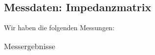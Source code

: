 \subsection{Messdaten: Impedanzmatrix}
\label{subsec:4_Daten}
%
%
%
Wir haben die folgenden Messungen:
\begin{table}[H]
  \small
  \centering
	\caption{Messergebnisse}
	\label{tab:Messdaten}
	\begin{tabular}{rrrrrrr}
	  \toprule

    

    \midrule

		\bottomrule
	\end{tabular}
\end{table}

